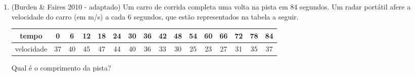 \documentclass[a4paper]{article}
\begin{document}
\begin{enumerate}

\item (Burden \& Faires 2010 - adaptado) Um carro de corrida completa
  uma volta na pista em 84 segundos. Um radar portátil afere a
  velocidade do carro (em m/s) a cada 6 segundos, que estão
  representados na tabela a seguir.

  \begin{tabular}{c|ccccccccccccccc}
    tempo & 0 & 6 & 12 & 18 & 24 & 30 & 36 & 42 & 48 & 54 & 60 & 66 & 72 & 78 & 84\\
    \hline
    velocidade & 37 & 40& 45& 47& 44& 40& 36& 33& 30& 25& 23& 27& 31& 35& 37\\
  \end{tabular}

  Qual é o comprimento da pista?


\end{enumerate}
\end{document}
